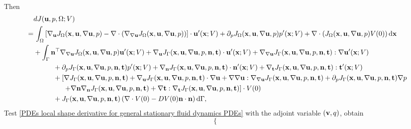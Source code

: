 \documentclass[oneside,11pt]{book}
\numberwithin{equation}{section}
\begin{document}
\begin{enumerate}[leftmargin=0in]
\begin{align*}
    \end{align*}
    Then
    \begin{align*}
        &dJ({\bf u},p,\Omega;V)\\
        =&\, \int_\Omega \left[\nabla_{\bf u}J_\Omega({\bf x},{\bf u},\nabla{\bf u},p) - \nabla\cdot(\nabla_{\nabla{\bf u}}J_\Omega({\bf x},{\bf u},\nabla{\bf u},p))\right]\cdot{\bf u}'({\bf x};V) + \partial_pJ_\Omega({\bf x},{\bf u},\nabla{\bf u},p)p'({\bf x};V) + \nabla\cdot\left(J_\Omega({\bf x},{\bf u},\nabla{\bf u},p)V(0)\right){\rm d}{\bf x}\\
        &+ \int_\Gamma {\bf n}^\top\nabla_{\nabla{\bf u}}J_\Omega({\bf x},{\bf u},\nabla{\bf u},p){\bf u}'({\bf x};V) + \nabla_{\bf u}J_\Gamma({\bf x},{\bf u},\nabla{\bf u},p,{\bf n},{\bf t})\cdot{\bf u}'({\bf x};V) + \nabla_{\nabla{\bf u}}J_\Gamma({\bf x},{\bf u},\nabla{\bf u},p,{\bf n},{\bf t}):\nabla{\bf u}'({\bf x};V)\\
        &\hspace{1cm}+ \partial_pJ_\Gamma({\bf x},{\bf u},\nabla{\bf u},p,{\bf n},{\bf t})p'({\bf x};V) + \nabla_{\bf n}J_\Gamma({\bf x},{\bf u},\nabla{\bf u},p,{\bf n},{\bf t})\cdot{\bf n}'({\bf x};V) + \nabla_{\bf t}J_\Gamma({\bf x},{\bf u},\nabla{\bf u},p,{\bf n},{\bf t}):{\bf t}'({\bf x};V)\\
        &\hspace{1cm}+ \left[\nabla J_\Gamma({\bf x},{\bf u},\nabla{\bf u},p,{\bf n},{\bf t}) + \nabla_{\bf u}J_\Gamma({\bf x},{\bf u},\nabla{\bf u},p,{\bf n},{\bf t})\cdot\nabla{\bf u} + \nabla\nabla{\bf u}:\nabla_{\nabla{\bf u}}J_\Gamma({\bf x},{\bf u},\nabla{\bf u},p,{\bf n},{\bf t}) + \partial_pJ_\Gamma({\bf x},{\bf u},\nabla{\bf u},p,{\bf n},{\bf t})\nabla p\right.\\
        &\hspace{15mm} \left.+ \nabla{\bf n}\nabla_{\bf n}J_\Gamma({\bf x},{\bf u},\nabla{\bf u},p,{\bf n},{\bf t}) + \nabla{\bf t}:\nabla_{\bf t}J_\Gamma({\bf x},{\bf u},\nabla{\bf u},p,{\bf n},{\bf t})\right]\cdot V(0)\\
        &\hspace{1cm}+ J_\Gamma({\bf x},{\bf u},\nabla{\bf u},p,{\bf n},{\bf t})\left(\nabla\cdot V(0) - DV(0){\bf n}\cdot{\bf n}\right){\rm d}\Gamma,
    \end{align*}
    Test \eqref{PDEs local shape derivative for general stationary fluid dynamics PDEs} with the adjoint variable $({\bf v},q)$, obtain
    \begin{equation*}
        \left\{\begin{split}

\end{split}
\end{equation*}
\end{enumerate}
\end{document}
